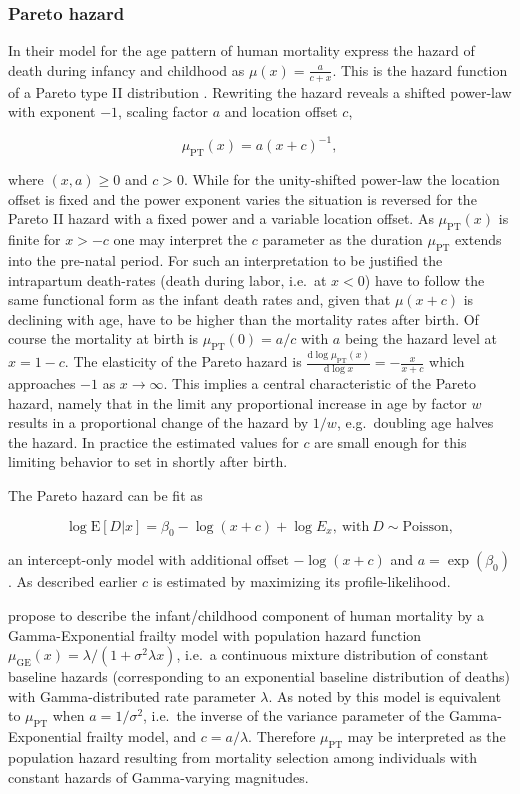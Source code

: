 \documentclass[smallextended]{svjour3} %
\begin{document}
\subsubsection*{Pareto hazard}\label{pareto-hazard}

In their model for the age pattern of human mortality \citet{DeBeer2016}
express the hazard of death during infancy and childhood as
\(\mu(x)=\frac{a}{c+x}\). This is the hazard function of a Pareto type
II distribution \citep[pp.~400]{Lomax1954, Marshall2007}. Rewriting the
hazard reveals a shifted power-law with exponent \(-1\), scaling factor
\(a\) and location offset \(c\),

\[
\mu_\text{PT}(x) = a(x+c)^{-1},
\]

where \((x, a)\geq 0\) and \(c > 0\). While for the unity-shifted
power-law the location offset is fixed and the power exponent varies the
situation is reversed for the Pareto II hazard with a fixed power and a
variable location offset. As \(\mu_\text{PT}(x)\) is finite for \(x>-c\)
one may interpret the \(c\) parameter as the duration \(\mu_\text{PT}\)
extends into the pre-natal period. For such an interpretation to be
justified the intrapartum death-rates (death during labor, i.e.~at
\(x<0\)) have to follow the same functional form as the infant death
rates and, given that \(\mu(x+c)\) is declining with age, have to be
higher than the mortality rates after birth. Of course the mortality at
birth is \(\mu_\text{PT}(0)=a/c\) with \(a\) being the hazard level at
\(x=1-c\). The elasticity of the Pareto hazard is
\(\frac{\text{d}\log\mu_\text{PT}(x)}{\text{d}\log x}=-\frac{x}{x+c}\)
which approaches \(-1\) as \(x\rightarrow\infty\). This implies a
central characteristic of the Pareto hazard, namely that in the limit
any proportional increase in age by factor \(w\) results in a
proportional change of the hazard by \(1/w\), e.g.~doubling age halves
the hazard. In practice the estimated values for \(c\) are small enough
for this limiting behavior to set in shortly after birth.

The Pareto hazard can be fit as

\[
\log\text{E}[D|x] = \beta_0 - \log(x+c) + \log E_x,~\text{with}~D\sim\text{Poisson},
\]

an intercept-only model with additional offset \(-\log(x+c)\) and
\(a=\exp(\beta_0)\). As described earlier \(c\) is estimated by
maximizing its profile-likelihood.

\citet{Vaupel1983} propose to describe the infant/childhood component of
human mortality by a Gamma-Exponential frailty model with population
hazard function \(\mu_\text{GE}(x)=\lambda/(1+\sigma^2\lambda x)\),
i.e.~a continuous mixture distribution of constant baseline hazards
(corresponding to an exponential baseline distribution of deaths) with
Gamma-distributed rate parameter \(\lambda\). As noted by
\citet{Wienke2011} this model is equivalent to \(\mu_\text{PT}\) when
\(a=1/\sigma^2\), i.e.~the inverse of the variance parameter of the
Gamma-Exponential frailty model, and \(c = a/\lambda\). Therefore
\(\mu_\text{PT}\) may be interpreted as the population hazard resulting
from mortality selection among individuals with constant hazards of
Gamma-varying magnitudes.
\end{document}
